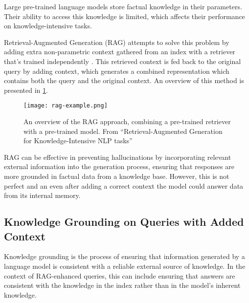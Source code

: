 Large pre-trained language models store factual knowledge in their parameters.
Their ability to access this knowledge is limited, which affects their performance on knowledge-intensive tasks.

Retrieval-Augmented Generation (RAG) attempts to solve this problem by adding extra non-parametric context gathered from an index with a retriever that's trained independently \citep{rag}.
This retrieved context is fed back to the original query by adding context, which generates a combined representation which contains both the query and the original context.
An overview of this method is presented in \cref{rag_overview}.

\begin{figure}[htp]
	\centering
	\texttt{[image: rag-example.png]}
	\caption{An overview of the RAG approach, combining a pre-trained retriever with a pre-trained model. From ``Retrieval-Augmented Generation for Knowledge-Intensive NLP tasks'' \citep{rag}}
	\label{rag_overview}
\end{figure}

RAG can be effective in preventing hallucinations by incorporating relevant external information into the generation process, ensuring that responses are more grounded in factual data from a knowledge base.
However, this is not perfect and an even after adding a correct context the model could answer data from its internal memory.



\subsection{Knowledge Grounding on Queries with Added Context}

Knowledge grounding is the process of ensuring that information generated by a language model is consistent with a reliable external source of knowledge.
In the context of RAG-enhanced queries, this can include ensuring that answers are consistent with the knowledge in the index rather than in the model's inherent knowledge.

